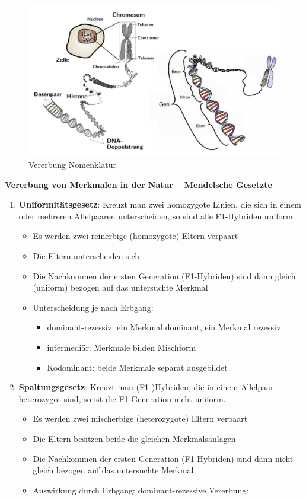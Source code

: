 \begin{figure}
	\centering
	\includegraphics[width=.5\textwidth]{figures/nomenklatur.png}
	\caption{Vererbung Nomenklatur}
	\label{nom}
\end{figure}
\noindent
\textbf{Vererbung von Merkmalen in der Natur -- Mendelsche Gesetzte}
\begin{enumerate}
	\item \textbf{Uniformitätsgesetz}:
	Kreuzt man zwei homozygote Linien, die sich in einem oder mehreren Allelpaaren unterscheiden, so sind alle F1-Hybriden uniform.
	\begin{itemize}
		\item Es werden zwei reinerbige (homozygote) Eltern verpaart
		\item Die Eltern unterscheiden sich
		\item Die Nachkommen der ersten Generation (F1-Hybriden) sind dann gleich (uniform) bezogen auf das untersuchte Merkmal
		\item Unterscheidung je nach Erbgang:
		\begin{itemize}
			\item dominant-rezessiv: ein Merkmal dominant, ein Merkmal rezessiv
			\item intermediär: Merkmale bilden Mischform
			\item Kodominant: beide Merkmale separat ausgebildet
		\end{itemize}
	\end{itemize}
	\item \textbf{Spaltungsgesetz}:
	Kreuzt man (F1-)Hybriden, die in einem Allelpaar heterozygot sind, so ist die F1-Generation nicht uniform.
	\begin{itemize}
		\item Es werden zwei mischerbige (heterozygote) Eltern verpaart
		\item Die Eltern besitzen beide die gleichen Merkmalsanlagen
		\item Die Nachkommen der ersten Generation (F1-Hybriden) sind dann nicht gleich bezogen auf das untersuchte Merkmal
		\item Auswirkung durch Erbgang: dominant-rezessive Vererbung:

\end{itemize}
\end{enumerate}
